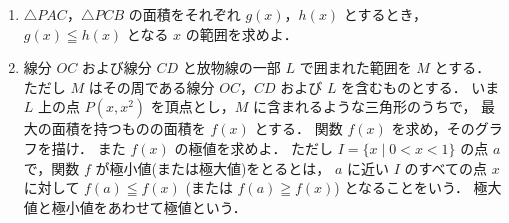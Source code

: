 \documentclass[../../main.tex]{subfiles}
\begin{document}
\begin{enumerate}
  \item $\triangle PAC$，$\triangle PCB$ の面積をそれぞれ $g(x)$，$h(x)$ とするとき，
    $g(x) \leqq h(x)$ となる $x$ の範囲を求めよ．

  \item 線分 $OC$ および線分 $CD$ と放物線の一部 $L$ で囲まれた範囲を $M$ とする．
    ただし $M$ はその周である線分 $OC$，$CD$ および $L$ を含むものとする．
    いま $L$ 上の点 $P(x,x^2)$ を頂点とし，$M$ に含まれるような三角形のうちで，
    最大の面積を持つものの面積を $f(x)$ とする．
    関数 $f(x)$ を求め，そのグラフを描け．
    また $f(x)$ の極値を求めよ．
    ただし $I=\{ x \mid 0<x<1 \}$ の点 $a$ で，関数 $f$ が極小値(または極大値)をとるとは，
    $a$ に近い $I$ のすべての点 $x$ に対して $f(a) \leqq f(x)$ (または $f(a) \geqq f(x)$) となることをいう．
    極大値と極小値をあわせて極値という．
\end{enumerate}
\end{document}
